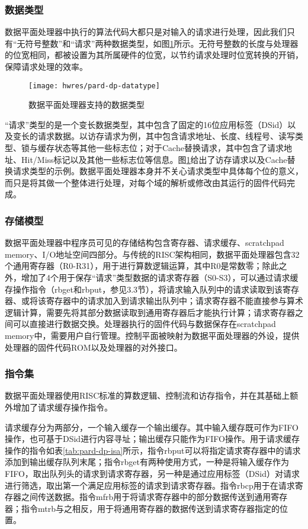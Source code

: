 \subsubsection{数据类型}

数据平面处理器中执行的算法代码大都只是对输入的请求进行处理，因此我们只有``无符号整数''和``请求''两种数据类型，如图\ref{fig:pard-dp-datatype}所示。无符号整数的长度与处理器的位宽相同，都被设置为其所属硬件的位宽，以节约请求处理时位宽转换的开销，保障请求处理的效率。

\begin{figure}[H]
  \centering
  \texttt{[image: hwres/pard-dp-datatype]}
  \caption{数据平面处理器支持的数据类型}
  \label{fig:pard-dp-datatype}
\end{figure}
 
``请求''类型的是一个变长数据类型，其中包含了固定的16位应用标签（DSid）以及变长的请求数据。以访存请求为例，其中包含请求地址、长度、线程号、读写类型、锁与缓存状态等其他一些标志位；对于Cache替换请求，其中包含了请求地址、Hit/Miss标记以及其他一些标志位等信息。图\ref{fig:pard-dp-datatype}给出了访存请求以及Cache替换请求类型的示例。数据平面处理器本身并不关心请求类型中具体每个位的意义，而只是将其做一个整体进行处理，对每个域的解析或修改由其运行的固件代码完成。

\subsubsection{存储模型}
数据平面处理器中程序员可见的存储结构包含寄存器、请求缓存、scratchpad memory、I/O地址空间四部分。与传统的RISC架构相同，数据平面处理器包含32个通用寄存器（R0-R31），用于进行算数逻辑运算，其中R0是常数零；除此之外，增加了4个用于保存``请求''类型数据的请求寄存器（S0-S3），可以通过请求缓存操作指令（rbget和rbput，参见3.3节），将请求输入队列中的请求读取到该寄存器、或将该寄存器中的请求加入到请求输出队列中；请求寄存器不能直接参与算术逻辑计算，需要先将其部分数据读取到通用寄存器后才能执行计算；请求寄存器之间可以直接进行数据交换。处理器执行的固件代码与数据保存在scratchpad memory中，需要用户自行管理。控制平面被映射为数据平面处理器的外设，提供处理器的固件代码ROM以及处理器的对外接口。

\subsubsection{指令集}
数据平面处理器使用RISC标准的算数逻辑、控制流和访存指令，并在其基础上额外增加了请求缓存操作指令。

请求缓存分为两部分，一个输入缓存一个输出缓存。其中输入缓存既可作为FIFO操作，也可基于DSid进行内容寻址；输出缓存只能作为FIFO操作。用于请求缓存操作的指令如表\ref{tab:pard-dp-isa}所示，指令rbput可以将指定请求寄存器中的请求添加到输出缓存队列末尾；指令rbget有两种使用方式，一种是将输入缓存作为FIFO，取出队列头的请求到请求寄存器，另一种是通过应用标签（DSid）对请求进行筛选，取出第一个满足应用标签的请求到请求寄存器。指令rbcp用于在请求寄存器之间传送数据。指令mfrb用于将请求寄存器中的部分数据传送到通用寄存器；指令mtrb与之相反，用于将通用寄存器的数据传送到请求寄存器指定的位置。

